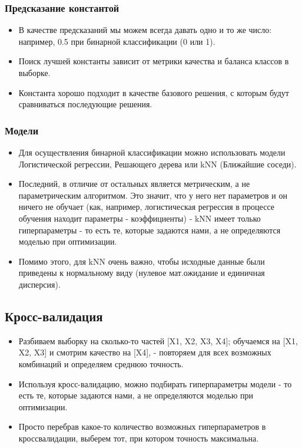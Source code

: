 \documentclass{article}
\begin{document}
 \subsubsection{Предсказание константой}
 \begin{itemize}
  \item В качестве предсказаний мы можем всегда давать одно и то же число: например, 0.5 при бинарной классификации (0 или 1).
  \item Поиск лучшей константы зависит от метрики качества и баланса классов в выборке.
  \item Константа хорошо подходит в качестве базового решения, с которым будут сравниваться последующие решения.
 \end{itemize}
 
 \subsubsection{Модели}
  \begin{itemize}
 \item Для осуществления бинарной классификации можно использовать модели Логистической регрессии, Решающего дерева или kNN (Ближайшие соседи).
 
 \item Последний, в отличие от остальных является метрическим, а не параметрическим алгоритмом. Это значит, что у него нет параметров и он ничего не обучает (как, например, логистическая регрессия в процессе обучения находит параметры - коэффициенты) - kNN имеет только гиперпараметры - то есть те, которые задаются нами, а не определяются моделью при оптимизации.
 
 \item Помимо этого, для kNN очень важно, чтобы исходные данные были приведены к нормальному виду (нулевое мат.ожидание и единичная дисперсия).
 
 \end{itemize}
 
 
 \subsection{Кросс-валидация}
  \begin{itemize}
    \item Разбиваем выборку на сколько-то частей [X1, X2, X3, X4]; обучаемся на [X1, X2, X3] и смотрим качество на [X4], - повторяем для всех возможных комбинаций и определяем среднюю точность.
    
    \item Используя кросс-валидацию, можно подбирать гиперпараметры модели - то есть те, которые задаются нами, а не определяются моделью при оптимизации.
    
    \item Просто перебрав какое-то количество возможных гиперпараметров в кроссвалидации, выберем тот, при котором точность максимальна.
    \end{itemize}
    
\end{document}
